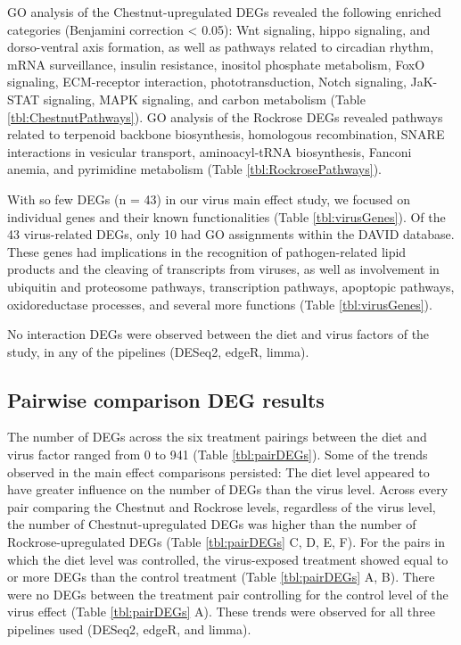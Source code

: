 \documentclass[11pt,a4paper,oldfontcommands,openany]{memoir}
\numberwithin{equation}{section} %
\begin{document}
GO analysis of the Chestnut-upregulated DEGs revealed the following enriched categories (Benjamini correction < 0.05): Wnt signaling, hippo signaling, and dorso-ventral axis formation, as well as pathways related to circadian rhythm, mRNA surveillance, insulin resistance, inositol phosphate metabolism, FoxO signaling, ECM-receptor interaction, phototransduction, Notch signaling, JaK-STAT signaling, MAPK signaling, and carbon metabolism (Table \ref{tbl:ChestnutPathways}). GO analysis of the Rockrose DEGs revealed pathways related to terpenoid backbone biosynthesis, homologous recombination, SNARE interactions in vesicular transport, aminoacyl-tRNA biosynthesis, Fanconi anemia, and pyrimidine metabolism (Table \ref{tbl:RockrosePathways}).

With so few DEGs (n = 43) in our virus main effect study, we focused on individual genes and their known functionalities (Table \ref{tbl:virusGenes}). Of the 43 virus-related DEGs, only 10 had GO assignments within the DAVID database. These genes had implications in the recognition of pathogen-related lipid products and the cleaving of transcripts from viruses, as well as involvement in ubiquitin and proteosome pathways, transcription pathways, apoptopic pathways, oxidoreductase processes, and several more functions (Table \ref{tbl:virusGenes}).

No interaction DEGs were observed between the diet and virus factors of the study, in any of the pipelines (DESeq2, edgeR, limma).

\subsection{Pairwise comparison DEG results}

The number of DEGs across the six treatment pairings between the diet and virus factor ranged from 0 to 941 (Table \ref{tbl:pairDEGs}). Some of the trends observed in the main effect comparisons persisted: The diet level appeared to have greater influence on the number of DEGs than the virus level. Across every pair comparing the Chestnut and Rockrose levels, regardless of the virus level, the number of Chestnut-upregulated DEGs was higher than the number of Rockrose-upregulated DEGs (Table \ref{tbl:pairDEGs} C, D, E, F). For the pairs in which the diet level was controlled, the virus-exposed treatment showed equal to or more DEGs than the control treatment (Table \ref{tbl:pairDEGs} A, B). There were no DEGs between the treatment pair controlling for the control level of the virus effect (Table \ref{tbl:pairDEGs} A). These trends were observed for all three pipelines used (DESeq2, edgeR, and limma). 
\end{document}
